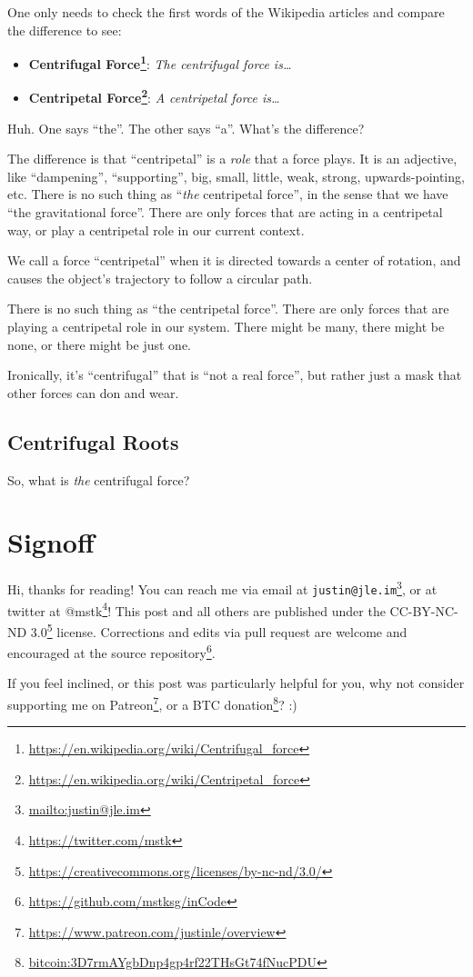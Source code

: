 \documentclass[]{article}
\renewcommand{\href}[2]{#2\footnote{\url{#1}}}
\begin{document}
One only needs to check the first words of the Wikipedia articles and compare
the difference to see:

\begin{itemize}
\tightlist
\item
  \textbf{\href{https://en.wikipedia.org/wiki/Centrifugal_force}{Centrifugal
  Force}}: \emph{The centrifugal force is\ldots{}}
\item
  \textbf{\href{https://en.wikipedia.org/wiki/Centripetal_force}{Centripetal
  Force}}: \emph{A centripetal force is\ldots{}}
\end{itemize}

Huh. One says ``the''. The other says ``a''. What's the difference?

The difference is that ``centripetal'' is a \emph{role} that a force plays. It
is an adjective, like ``dampening'', ``supporting'', big, small, little, weak,
strong, upwards-pointing, etc. There is no such thing as ``\emph{the}
centripetal force'', in the sense that we have ``the gravitational force''.
There are only forces that are acting in a centripetal way, or play a
centripetal role in our current context.

We call a force ``centripetal'' when it is directed towards a center of
rotation, and causes the object's trajectory to follow a circular path.

There is no such thing as ``the centripetal force''. There are only forces that
are playing a centripetal role in our system. There might be many, there might
be none, or there might be just one.

Ironically, it's ``centrifugal'' that is ``not a real force'', but rather just a
mask that other forces can don and wear.

\hypertarget{centrifugal-roots}{%
\subsection{Centrifugal Roots}\label{centrifugal-roots}}

So, what is \emph{the} centrifugal force?

\hypertarget{signoff}{%
\section{Signoff}\label{signoff}}

Hi, thanks for reading! You can reach me via email at
\href{mailto:justin@jle.im}{\nolinkurl{justin@jle.im}}, or at twitter at
\href{https://twitter.com/mstk}{@mstk}! This post and all others are published
under the \href{https://creativecommons.org/licenses/by-nc-nd/3.0/}{CC-BY-NC-ND
3.0} license. Corrections and edits via pull request are welcome and encouraged
at \href{https://github.com/mstksg/inCode}{the source repository}.

If you feel inclined, or this post was particularly helpful for you, why not
consider \href{https://www.patreon.com/justinle/overview}{supporting me on
Patreon}, or a \href{bitcoin:3D7rmAYgbDnp4gp4rf22THsGt74fNucPDU}{BTC donation}?
:)
\end{document}

